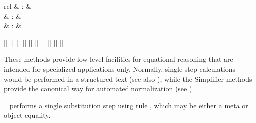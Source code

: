 \begin{isabellebody}
\begin{isamarkuptext}
\begin{description}
  \end{description}%
\end{isamarkuptext}%
\isamarkuptrue%
%
\isamarkuptrue%
%
\begin{isamarkuptext}%
\begin{matharray}{rcl}
    \hypertarget{method.subst}{\hyperlink{method.subst}{\mbox{}}} & : &  \\
    \hypertarget{method.hypsubst}{\hyperlink{method.hypsubst}{\mbox{}}} & : &  \\
    \hypertarget{method.split}{\hyperlink{method.split}{\mbox{}}} & : &  \\
  \end{matharray}

  \begin{railoutput}
[]
\rail@bar
{}
[]
[]
[]
\rail@endbar
{}
\rail@bar
{}
[]
\rail@plus
{}[]
\rail@endplus
{}[]
\rail@endbar
{}[]
\rail@end
{}
[]
[]
\rail@end
\end{railoutput}


  These methods provide low-level facilities for equational reasoning
  that are intended for specialized applications only.  Normally,
  single step calculations would be performed in a structured text
  (see also ), while the Simplifier methods
  provide the canonical way for automated normalization (see
  ).

  \begin{description}

  \item \hyperlink{method.subst}{\mbox{}}~ performs a single substitution step
  using rule , which may be either a meta or object
  equality.


\end{description}
\end{isamarkuptext}
\end{isabellebody}
